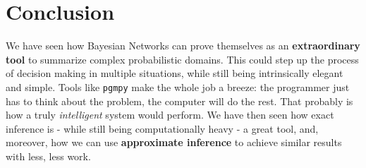 \section{Conclusion}
\label{sec:conclusion}
We have seen how Bayesian Networks can prove themselves as an \textbf{extraordinary tool} to summarize complex probabilistic domains. This could step up the process of decision making in multiple situations, while still being intrinsically elegant and simple. Tools like \texttt{pgmpy} make the whole job a breeze: the programmer just has to think about the problem, the computer will do the rest. That probably is how a truly \textit{intelligent} system would perform. We have then seen how exact inference is - while still being computationally heavy - a great tool, and, moreover, how we can use \textbf{approximate inference} to achieve similar results with less, less work. 